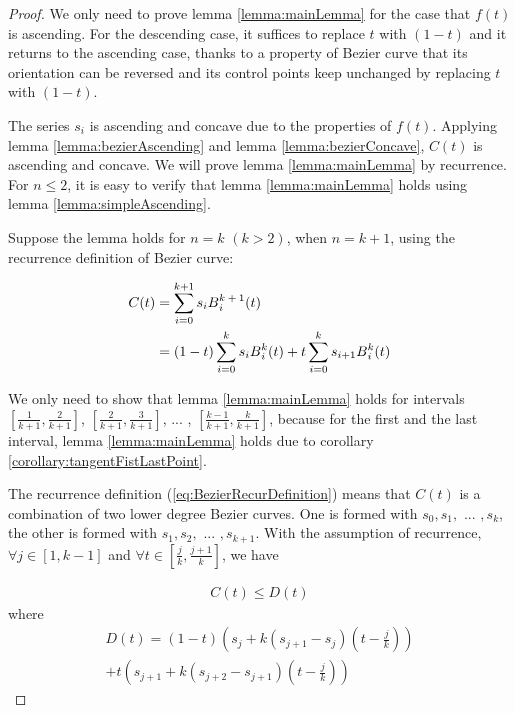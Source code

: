 \begin{proof}
We only need to prove lemma \ref{lemma:mainLemma} for the case that $f(t)$ is ascending. For the descending case, it suffices to replace $t$ with $(1-t)$ and it returns to the ascending case, thanks to a property of Bezier curve that its orientation can be reversed and its control points keep unchanged by replacing  $t$ with $(1-t)$.

The series $s_{i}$ is ascending and concave due to the properties of $f(t)$. Applying lemma \ref{lemma:bezierAscending} and lemma \ref{lemma:bezierConcave}, $C(t)$ is ascending and concave.
We will prove lemma \ref{lemma:mainLemma} by recurrence. For $n \le 2$, it is easy to verify that lemma \ref{lemma:mainLemma} holds using lemma \ref{lemma:simpleAscending}.

Suppose the lemma holds for $n=k$ $(k > 2)$, when $n=k+1$, using the recurrence definition of Bezier curve:

\begin{equation}\begin{split}
C(t)&=\sum_{i=0}^{k+1}s_{i}B\textsupsub{$k+1$}{$i$}(t) \\
&=(1-t)\sum_{i=0}^{k}s_{i}B\textsupsub{$k$}{$i$}(t)+t\sum_{i=0}^{k}s_{i+1}B\textsupsub{$k$}{$i$}(t)
\label{eq:BezierRecurDefinition}
\end{split}\end{equation}

We only need to show that lemma \ref{lemma:mainLemma} holds for intervals $\left[\frac{1}{k+1}, \frac{2}{k+1}\right]$, $\left[\frac{2}{k+1}, \frac{3}{k+1}\right]$, ... , 
$\left[\frac{k-1}{k+1}, \frac{k}{k+1}\right]$, because for the first and the last interval, lemma \ref{lemma:mainLemma} holds due to corollary \ref{corollary:tangentFistLastPoint}.

The recurrence definition (\ref{eq:BezierRecurDefinition}) means that $C(t)$ is a combination of two lower degree Bezier curves. One is formed with $s_{0}, s_{1},$ $...$ $, s_{k}$, the other is formed with $s_{1}, s_{2},$ $...$ $, s_{k+1}$. With the assumption of recurrence, $\forall j \in \left[1, k-1\right]$ and 
$\forall t \in \left[\frac{j}{k}, \frac{j+1}{k}\right]$, we have

\begin{equation}\begin{split}
C(t) \le D(t)
\label{eq:BezierRecurIniquality}
\end{split}\end{equation}
where
\begin{equation}\begin{split}
D(t) = (1-t)(s_{j}+k(s_{j+1}-s_{j})(t-\frac{j}{k})) \\
+t(s_{j+1}+k(s_{j+2}-s_{j+1})(t-\frac{j}{k}))
\label{eq:BezierRecurIniqualityRightSide}
\end{split}\end{equation}


\end{proof}
